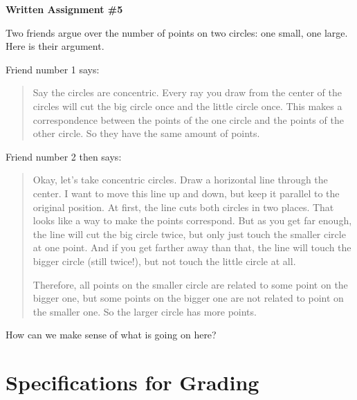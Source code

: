 \documentclass[12pt,letterpaper]{article}
\begin{document}
\setlength{\parskip}{1ex plus 0.5ex minus 0.2ex}
\setlength{\parindent}{0pt}

\pagestyle{fancy}
\lfoot{}
\rfoot{}

\begin{center}
{
\Large
\textbf{Written Assignment \#5}
}
\end{center}

Two friends argue over the number of points on two circles: one small, one large.
Here is their argument.

Friend number 1 says:
\begin{quote}
Say the circles are concentric. 
Every ray you draw from the center of the circles will cut the big circle once and the little circle once. 
This makes a correspondence between the points of the one circle and the points of the other circle.
So they have the same amount of points.
\end{quote}

Friend number 2 then says:
\begin{quotation}
Okay, let's take concentric circles. Draw a horizontal line through the center.
I want to move this line up and down, but keep it parallel to the original position.
At first, the line cuts both circles in two places. 
That looks like a way to make the points correspond.
But as you get far enough, the line will cut the big circle twice, but only just touch the smaller circle at one point. 
And if you get farther away than that, the line will touch the bigger circle (still twice!), but not touch the little circle at all.

Therefore, all points on the smaller circle are related to some point on the bigger one, but some points on the bigger one are not related to point on the smaller one.
So the larger circle has more points.
\end{quotation}

How can we make sense of what is going on here?
\vspace{.1cm}
\begin{center}
\end{center}

\section*{Specifications for Grading}
\end{document}
